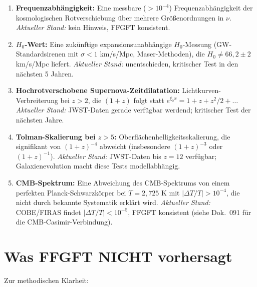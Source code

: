 \begin{enumerate}[leftmargin=2em,itemsep=4pt,topsep=2pt]
  \item \textbf{Frequenzabhängigkeit:}
        Eine messbare ($> 10^{-4}$) Frequenzabhängigkeit der
        kosmologischen Rotverschiebung über mehrere Größenordnungen
        in $\nu$.
        \emph{Aktueller Stand:} kein Hinweis, FFGFT konsistent.

  \item \textbf{$H_0$-Wert:}
        Eine zukünftige expansionsunabhängige $H_0$-Messung
        (GW-Standardsirenen mit $\sigma < 1$ km/s/Mpc, Maser-Methoden),
        die $H_0 \neq 66{,}2 \pm 2$ km/s/Mpc liefert.
        \emph{Aktueller Stand:} unentschieden, kritischer Test in den
        nächsten 5 Jahren.

  \item \textbf{Hochrotverschobene Supernova-Zeitdilatation:}
        Lichtkurven-Verbreiterung bei $z > 2$, die $(1+z)$ folgt
        statt $e^{\xi_0 x} = 1 + z + z^2/2 + \ldots$
        \emph{Aktueller Stand:} JWST-Daten gerade verfügbar werdend;
        kritischer Test der nächsten Jahre.

  \item \textbf{Tolman-Skalierung bei $z > 5$:}
        Oberflächenhelligkeitsskalierung, die signifikant von
        $(1+z)^{-4}$ abweicht (insbesondere $(1+z)^{-3}$ oder
        $(1+z)^{-1}$).
        \emph{Aktueller Stand:} JWST-Daten bis $z = 12$ verfügbar;
        Galaxienevolution macht diese Tests modellabhängig.

  \item \textbf{CMB-Spektrum:}
        Eine Abweichung des CMB-Spektrums von einem perfekten
        Planck-Schwarzkörper bei $T = 2{,}725$ K mit
        $|\Delta T/T| > 10^{-4}$, die nicht durch bekannte
        Systematik erklärt wird.
        \emph{Aktueller Stand:} COBE/FIRAS findet
        $|\Delta T/T| < 10^{-5}$, FFGFT konsistent (siehe Dok.~091
        für die CMB-Casimir-Verbindung).
\end{enumerate}

\section{Was FFGFT NICHT vorhersagt}

Zur methodischen Klarheit:

